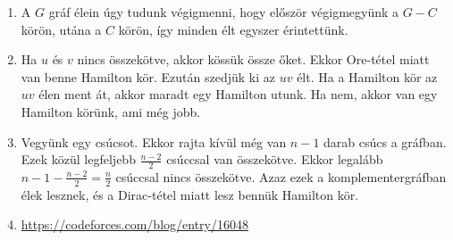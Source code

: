\documentclass[a4paper, 12pt]{article}
\begin{document}
\begin{enumerate}
    \item A $G$ gráf élein úgy tudunk végigmenni, hogy először végigmegyünk a $G-C$ körön, utána a $C$ körön, így minden élt egyszer érintettünk.
    \item Ha $u$ és $v$ nincs összekötve, akkor kössük össze őket. Ekkor Ore-tétel miatt van benne Hamilton kör. Ezután szedjük ki az $uv$ élt. Ha a Hamilton kör az $uv$ élen ment át, akkor maradt egy Hamilton utunk. Ha nem, akkor van egy Hamilton körünk, ami még jobb.
    \item Vegyünk egy csúcsot. Ekkor rajta kívül még van $n-1$ darab csúcs a gráfban. Ezek közül legfeljebb $\frac{n-2}{2}$ csúccsal van összekötve. Ekkor legalább $n-1-\frac{n-2}{2}=\frac{n}{2}$ csúccsal nincs összekötve. Azaz ezek a komplementergráfban élek lesznek, és a Dirac-tétel miatt lesz bennük Hamilton kör.
    \setcounter{enumi}{12}
    \item \url{https://codeforces.com/blog/entry/16048}
\end{enumerate}
\end{document}
